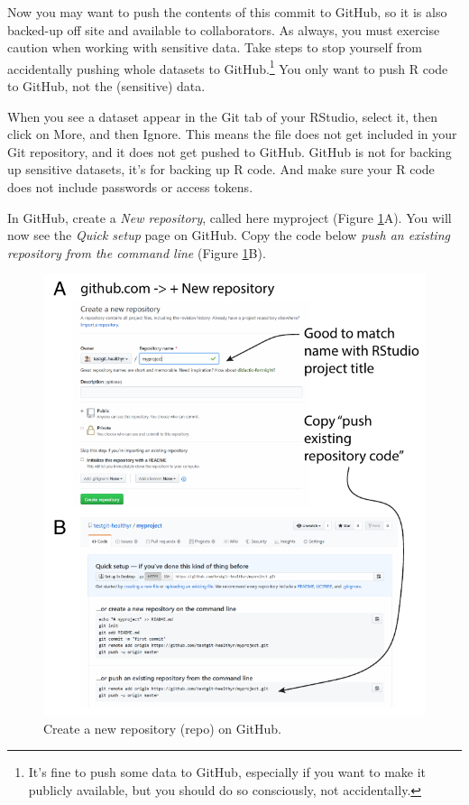 \documentclass[
  12pt,
  krantz2]{krantz}
\begin{document}

Now you may want to push the contents of this commit to GitHub, so it is also backed-up off site and available to collaborators.
As always, you must exercise caution when working with sensitive data.
Take steps to stop yourself from accidentally pushing whole datasets to GitHub.\footnote{It's fine to push some data to GitHub, especially if you want to make it publicly available, but you should do so consciously, not accidentally.}
You only want to push R code to GitHub, not the (sensitive) data.

When you see a dataset appear in the Git tab of your RStudio, select it, then click on More, and then Ignore.
This means the file does not get included in your Git repository, and it does not get pushed to GitHub.
GitHub is not for backing up sensitive datasets, it's for backing up R code.
And make sure your R code does not include passwords or access tokens.

In GitHub, create a \emph{New repository}, called here myproject (Figure \ref{fig:chap14-fig-newrepo}A).
You will now see the \emph{Quick setup} page on GitHub.
Copy the code below \emph{push an existing repository from the command line} (Figure \ref{fig:chap14-fig-newrepo}B).

\begin{figure}
\centering
\includegraphics{images/chapter14/5.pdf}
\caption{\label{fig:chap14-fig-newrepo}Create a new repository (repo) on GitHub.}
\end{figure}
\end{document}

